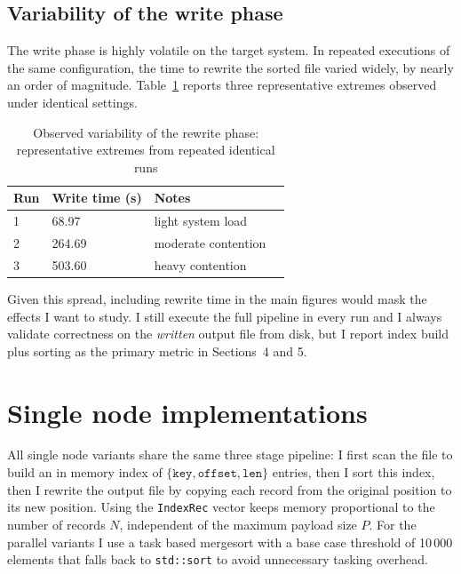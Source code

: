 \documentclass[12pt]{article}
\begin{document}
\subsection{Variability of the write phase}
The write phase is highly volatile on the target system. In repeated executions of the same configuration, the time to rewrite the sorted file varied widely, by nearly an order of magnitude. Table~\ref{tab:write-variance} reports three representative extremes observed under identical settings.

\begin{table}[h]
  \centering
  \caption{Observed variability of the rewrite phase: representative extremes from repeated identical runs}
  \label{tab:write-variance}
  \begin{tabular}{@{}llll@{}}
    \toprule
    Run & Write time (s) & Notes \\
    \midrule
    1   & 68.97   & light system load \\
    2   & 264.69  & moderate contention \\
    3   & 503.60  & heavy contention \\
    \bottomrule
  \end{tabular}
\end{table}

Given this spread, including rewrite time in the main figures would mask the effects I want to study. I still execute the full pipeline in every run and I always validate correctness on the \emph{written} output file from disk, but I report index build plus sorting as the primary metric in Sections~4 and 5.

\section{Single node implementations}

All single node variants share the same three stage pipeline: I first scan the file to build an in memory index of \(\{\texttt{key}, \texttt{offset}, \texttt{len}\}\) entries, then I sort this index, then I rewrite the output file by copying each record from the original position to its new position. Using the \texttt{IndexRec} vector keeps memory proportional to the number of records \(N\), independent of the maximum payload size \(P\). For the parallel variants I use a task based mergesort with a base case threshold of 10\,000 elements that falls back to \texttt{std::sort} to avoid unnecessary tasking overhead.
\end{document}
